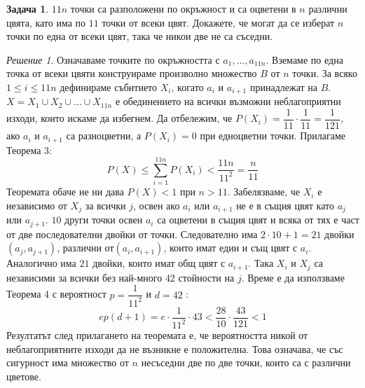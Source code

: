 \documentclass[11 pt, a4paper]{article}
\theoremstyle{definition}
\newtheorem{p}{Задача}
\theoremstyle{remark}
\newtheorem*{s}{Решение}
\begin{document}
\begin{p}
$11n$ точки са разположени по окръжност и са оцветени в $n$ различни цвята, като има по $11$ точки от всеки цвят. Докажете, че могат да се изберат $n$ точки по една от всеки цвят, така че никои две не са съседни.\par
\end{p}
\begin{s}
Означаваме точките по окръжността с $a_1,\dots,a_{11n}$. Вземаме по една точка от всеки цвяти конструираме произволно множество $B$ от $n$ точки. За всяко $1\leq i\leq 11n$ дефинираме събитието $X_i$, когато $a_i$ и $a_{i+1}$ принадлежат на $B$. $X=X_1\cup X_2 \cup\dots\cup X_{11n}$ е обединението на всички възможни неблагоприятни изходи, които искаме да избегнем. Да отбележим, че $P(X_i)=\dfrac{1}{11}\cdot\dfrac{1}{11}=\dfrac{1}{121}$, ако $a_i$ и $a_{i+1}$ са разноцветни, а $P(X_i)=0$ при едноцветни точки. Прилагаме Теорема 3: 
\begin{equation*}
P(X)\leq\sum_{i=1}^{11n}P(X_i)<\dfrac{11n}{11^2}=\dfrac{n}{11}
\end{equation*}
Теоремата обаче не ни дава $P(X)<1$ при $n>11$. Забелязваме, че $X_i$ е независимо от $X_j$ за всички $j$, освен ако $a_i$ или $a_{i+1}$ не е в същия цвят като $a_j$ или $a_{j+1}$. $10$ други точки освен $a_i$ са оцветени в същия цвят и всяка от тях е част от две последователни двойки от точки. Следователно има $2\cdot10+1=21$ двойки $(a_j,a_{j+1})$, различни от$(a_i,a_{i+1})$, които имат един и същ цвят с $a_i$. Аналогично има $21$ двойки, които имат общ цвят с $a_{i+1}$. Така $X_i$ и $X_j$ са независими за всички без най-много $42$ стойности на $j$. Време е да използваме Теорема 4 с вероятност $p=\dfrac{1}{11^2}$ и $d=42$ :
\begin{equation*}
ep(d+1)=e\cdot\dfrac{1}{11^2}\cdot43<\dfrac{28}{10}\cdot\dfrac{43}{121}<1
\end{equation*}
Резултатът след прилагането на теоремата е, че вероятността никой от неблагоприятните изходи да не възникне е положителна. Това означава, че със сигурност има множество от $n$ несъседни две по две точки, които са с различни цветове.  
\end{s}
\end{document}
